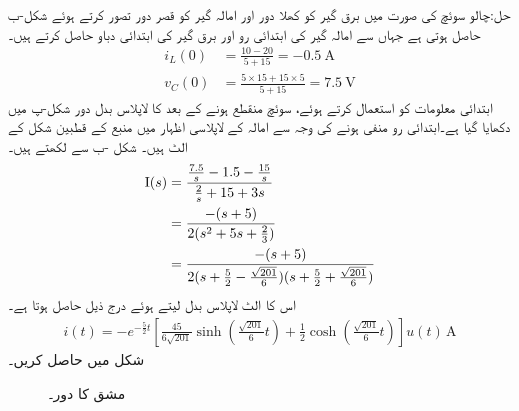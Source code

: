 حل:چالو سوئچ کی صورت میں برق گیر کو کھلا دور اور امالہ گیر کو قصر دور تصور کرتے ہوئے شکل-ب حاصل ہوتی ہے جہاں سے  امالہ گیر کی ابتدائی رو  اور برق گیر کی ابتدائی دباو  حاصل کرتے ہیں۔
\begin{align*}
i_L(0)&=\frac{10-20}{5+15}=\SI{-0.5}{\ampere}\\
v_C(0)&=\frac{5\times 15+15\times 5 }{5+15}=\SI{7.5}{\volt}
\end{align*}
ابتدائی معلومات کو استعمال کرتے ہوئے، سوئچ منقطع ہونے کے بعد کا لاپلاس بدل دور شکل-پ میں دکھایا گیا ہے۔ابتدائی رو منفی ہونے کی وجہ سے امالہ کے لاپلاسی اظہار میں  منبع کے قطبین شکل  کے الٹ ہیں۔ شکل -ب سے  لکھتے ہیں۔
\begin{align*}
{\ensuremath{{\textup{I}}}}(s)&=\frac{\frac{7.5}{s}-1.5-\frac{15}{s}}{\frac{2}{s}+15+3s}\\
&=\frac{-(s+5)}{2(s^2+5s+\frac{2}{3})}\\
&=\frac{-(s+5)}{2(s+\frac{5}{2}-\frac{\sqrt{201}}{6})(s+\frac{5}{2}+\frac{\sqrt{201}}{6})}
\end{align*}
اس کا الٹ لاپلاس بدل لیتے ہوئے درج ذیل حاصل ہوتا ہے۔
 \begin{align*}
i(t)=-e^{-\frac{5}{2}t}\left[\frac{45}{6\sqrt{201}} \sinh \left(\frac{\sqrt{201}}{6}t\right)+\frac{1}{2}\cosh \left(\frac{\sqrt{201}}{6}t\right)\right]u(t)\,\si{\ampere}
\end{align*}
شکل  میں  حاصل کریں۔
\begin{figure}
\centering
{}
\caption{مشق  کا دور۔}
\label{شکل_لاپلاس_استعمال_سوئچ_الف}
\end{figure}

